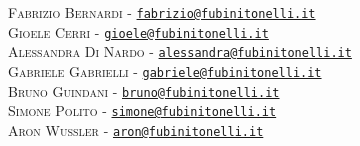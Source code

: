 \textsc{Fabrizio Bernardi} - \href{fabrizio@fubinitonelli.it}{\texttt{fabrizio@fubinitonelli.it}}\\
\textsc{Gioele Cerri} - \href{gioele@fubinitonelli.it}{\texttt{gioele@fubinitonelli.it}}\\
\textsc{Alessandra Di Nardo} - \href{alessandra@fubinitonelli.it}{\texttt{alessandra@fubinitonelli.it}}\\
\textsc{Gabriele Gabrielli} - \href{gabriele@fubinitonelli.it}{\texttt{gabriele@fubinitonelli.it}}\\
\textsc{Bruno Guindani} - \href{bruno@fubinitonelli.it}{\texttt{bruno@fubinitonelli.it}}\\
\textsc{Simone Polito} - \href{simone@fubinitonelli.it}{\texttt{simone@fubinitonelli.it}}\\
\textsc{Aron Wussler} - \href{aron@fubinitonelli.it}{\texttt{aron@fubinitonelli.it}}

\clearpage

\pagestyle{plain}


\hypersetup{linkcolor=black}


\setcounter{tocdepth}{2}
\tableofcontents
\hypersetup{linkcolor=blue}
\cleardoublepage

\pagestyle{inner}
